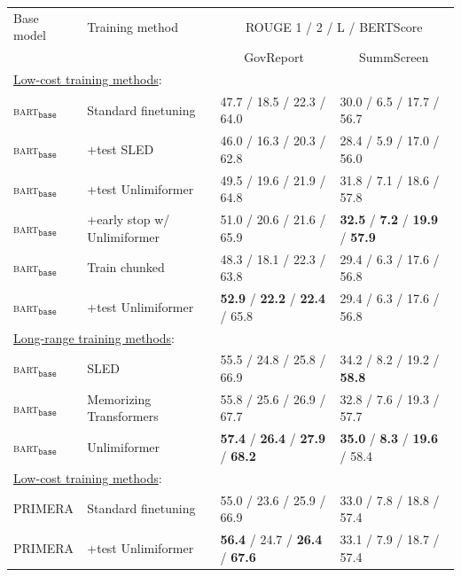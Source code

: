 \documentclass{article}
\newcommand{\ours}{Unlimiformer\xspace}
\begin{document}
\begin{table}[h]
\centering
\begin{tabular}{llll}
\toprule
Base model & Training method             & \multicolumn{2}{c}{ROUGE 1 / 2 / L / BERTScore} \\ %
& &\multicolumn{1}{c}{GovReport} & \multicolumn{1}{c}{SummScreen} \\
\midrule
\multicolumn{4}{l}{\qquad\quad\underline{Low-cost training methods}:} \\
\textsc{bart}$_{\texttt{base}}$       & Standard finetuning          & 47.7 / 18.5 / 22.3 / 64.0 & 30.0 / 6.5 / 17.7 / 56.7  \\
\textsc{bart}$_{\texttt{base}}$       & \qquad+test SLED                 &  46.0 / 16.3 / 20.3 / 62.8 &  28.4 / 5.9 / 17.0 / 56.0 \\
\textsc{bart}$_{\texttt{base}}$       & \qquad+test \ours                 &      49.5 / 19.6 / 21.9 / 64.8    &  31.8 / 7.1 / 18.6 / 57.8  \\
\textsc{bart}$_{\texttt{base}}$       & \qquad+early stop w/  \ours &      51.0 / 20.6 / 21.6 / 65.9 &\textbf{32.5} / \textbf{7.2} / \textbf{19.9} / \textbf{57.9} \\
\textsc{bart}$_{\texttt{base}}$    & Train chunked     &   48.3 / 18.1 / 22.3 / 63.8 &  29.4 / 6.3 / 17.6 / 56.8  \\
\textsc{bart}$_{\texttt{base}}$       & \qquad+test \ours      & \textbf{52.9} / \textbf{22.2} / \textbf{22.4} / 65.8 & 29.4 / 6.3 / 17.6 / 56.8 \\
\multicolumn{4}{l}{\qquad\quad\underline{Long-range training methods}:} \\
\textsc{bart}$_{\texttt{base}}$       & SLED  \citep{sled} & 55.5 / 24.8 / 25.8 / 66.9 & 34.2 / 8.2 / 19.2 / \textbf{58.8} \\
\textsc{bart}$_{\texttt{base}}$       & Memorizing Transformers  & 55.8 / 25.6 / 26.9 / 67.7 & 32.8 / 7.6 / 19.3 / 57.7  \\
\textsc{bart}$_{\texttt{base}}$       & \ours &  \textbf{57.4} / \textbf{26.4} / \textbf{27.9} / \textbf{68.2}   &  \textbf{35.0} / \textbf{8.3} / \textbf{19.6} / 58.4 \\ 
\midrule
\multicolumn{4}{l}{\qquad\quad\underline{Low-cost training methods}:} \\
\textsc{PRIMERA}    & Standard finetuning    &  55.0 / 23.6 / 25.9 / 66.9  & 33.0 / 7.8 / 18.8 / 57.4 \\
\textsc{PRIMERA}       & \qquad+test \ours                 &  \textbf{56.4} / 24.7 / \textbf{26.4} / \textbf{67.6}  &     33.1 / 7.9 / 18.7 / 57.4 \\

\end{tabular}
\end{table}
\end{document}

